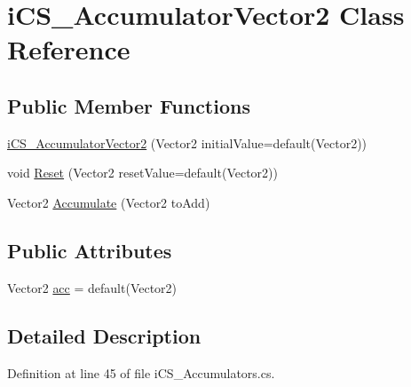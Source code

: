 \hypertarget{classi_c_s___accumulator_vector2}{\section{i\+C\+S\+\_\+\+Accumulator\+Vector2 Class Reference}
\label{classi_c_s___accumulator_vector2}
}
\subsection*{Public Member Functions}
\begin{DoxyCompactItemize}
\item 
\hyperlink{classi_c_s___accumulator_vector2_ac5da0b02a81be49c2c4fef5cfe844a2b}{i\+C\+S\+\_\+\+Accumulator\+Vector2} (Vector2 initial\+Value=default(Vector2))
\item 
void \hyperlink{classi_c_s___accumulator_vector2_af24e5a7c60890d42179fa5c7d3d1916c}{Reset} (Vector2 reset\+Value=default(Vector2))
\item 
Vector2 \hyperlink{classi_c_s___accumulator_vector2_aad5ccb12fc15e11a0600a2c4b0d674ed}{Accumulate} (Vector2 to\+Add)
\end{DoxyCompactItemize}
\subsection*{Public Attributes}
\begin{DoxyCompactItemize}
\item 
Vector2 \hyperlink{classi_c_s___accumulator_vector2_ac1acd4587433e5288d6c4ded2998e461}{acc} = default(Vector2)
\end{DoxyCompactItemize}


\subsection{Detailed Description}


Definition at line 45 of file i\+C\+S\+\_\+\+Accumulators.\+cs.



